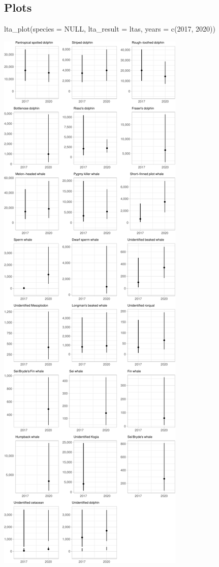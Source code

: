 \documentclass[
]{book}
\newenvironment{Shaded}{\begin{snugshade}}{\end{snugshade}}
\newcommand{\AttributeTok}[1]{\textcolor[rgb]{0.77,0.63,0.00}{#1}}
\newcommand{\ConstantTok}[1]{\textcolor[rgb]{0.00,0.00,0.00}{#1}}
\newcommand{\DecValTok}[1]{\textcolor[rgb]{0.00,0.00,0.81}{#1}}
\newcommand{\FunctionTok}[1]{\textcolor[rgb]{0.00,0.00,0.00}{#1}}
\newcommand{\NormalTok}[1]{#1}
\begin{document}
\hypertarget{plots-1}{%
\subsection*{Plots}\label{plots-1}}

\begin{Shaded}
\begin{Highlighting}[]
\FunctionTok{lta\_plot}\NormalTok{(}\AttributeTok{species =} \ConstantTok{NULL}\NormalTok{, }
         \AttributeTok{lta\_result =}\NormalTok{ ltas, }
         \AttributeTok{years =} \FunctionTok{c}\NormalTok{(}\DecValTok{2017}\NormalTok{, }\DecValTok{2020}\NormalTok{))}
\end{Highlighting}
\end{Shaded}

\includegraphics{figures/unnamed-chunk-375-1.pdf}
\end{document}
